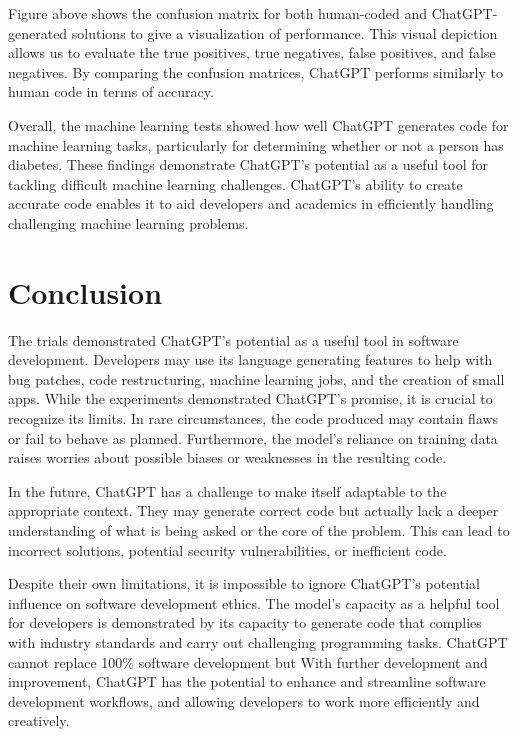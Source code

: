 \documentclass[conference]{IEEEtran}
\begin{document}
Figure above shows the confusion matrix for both human-coded and ChatGPT-generated solutions to give a visualization of performance. This visual depiction allows us to evaluate the true positives, true negatives, false positives, and false negatives. By comparing the confusion matrices, ChatGPT performs similarly to human code in terms of accuracy.

Overall, the machine learning tests showed how well ChatGPT generates code for machine learning tasks, particularly for determining whether or not a person has diabetes. These findings demonstrate ChatGPT's potential as a useful tool for tackling difficult machine learning challenges. ChatGPT's ability to create accurate code enables it to aid developers and academics in efficiently handling challenging machine learning problems.

\section{Conclusion}

The trials demonstrated ChatGPT's potential as a useful tool in software development. Developers may use its language generating features to help with bug patches, code restructuring, machine learning jobs, and the creation of small apps. While the experiments demonstrated ChatGPT's promise, it is crucial to recognize its limits. In rare circumstances, the code produced may contain flaws or fail to behave as planned. Furthermore, the model's reliance on training data raises worries about possible biases or weaknesses in the resulting code.

In the future, ChatGPT has a challenge to make itself adaptable to the appropriate context. They may generate correct code but actually lack a deeper understanding of what is being asked or the core of the problem. This can lead to incorrect solutions, potential security vulnerabilities, or inefficient code.

Despite their own limitations, it is impossible to ignore ChatGPT's potential influence on software development ethics. The model's capacity as a helpful tool for developers is demonstrated by its capacity to generate code that complies with industry standards and carry out challenging programming tasks. ChatGPT cannot replace 100\% software development but With further development and improvement, ChatGPT has the potential to enhance and streamline software development workflows, and allowing developers to work more efficiently and creatively.
\end{document}
